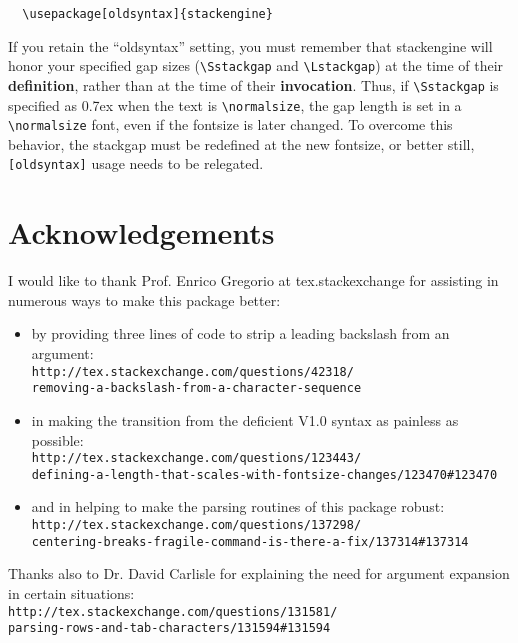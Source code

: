 \documentclass{article}
\let\vb\verb
\begin{document}
\vb|  \usepackage[oldsyntax]{stackengine}|

If you retain the ``oldsyntax'' setting, you must remember that
\textsf{stackengine} will honor your specified gap sizes
(\vb|\Sstackgap| and \vb|\Lstackgap|) at the time of their
\textbf{definition}, rather than at the time of their
\textbf{invocation}.  Thus, if \vb|\Sstackgap| is specified as 0.7ex
when the text is \vb|\normalsize|, the gap length is set in a
\vb|\normalsize| font, even if the fontsize is later changed.  To
overcome this behavior, the stackgap must be redefined at the new
fontsize, or better still, \vb|[oldsyntax]| usage needs to be
relegated.

\clearpage
\section{Acknowledgements}

I would like to thank Prof. Enrico Gregorio at tex.stackexchange for
assisting in numerous ways to make this package better:

\begin{itemize}

\item by providing  three lines of code to strip a leading 
backslash from an argument:\\
\vb|http://tex.stackexchange.com/questions/42318/|\\
\vb|removing-a-backslash-from-a-character-sequence|

\item in making the
transition from the deficient V1.0 syntax as painless as possible:\\
\vb|http://tex.stackexchange.com/questions/123443/|\\
\vb|defining-a-length-that-scales-with-fontsize-changes/123470#123470|

\item and in helping to make the parsing routines of this package robust:\\
\vb|http://tex.stackexchange.com/questions/137298/|\\
\vb|centering-breaks-fragile-command-is-there-a-fix/137314#137314|

\end{itemize}

Thanks also to Dr. David Carlisle for explaining the need for argument
expansion in certain situations:\\
\vb|http://tex.stackexchange.com/questions/131581/|\\
\vb|parsing-rows-and-tab-characters/131594#131594|
\end{document}
